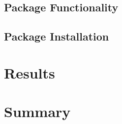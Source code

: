 \documentclass{pracamgr}
\theoremstyle{definition}
\begin{document}
	\section{Package Functionality}
		

	\section{Package Installation} \label{subsec:PackageInstall}
		
		
	
\chapter{Results}

\chapter{Summary}

%
%	
%
%		
%
%		
%		
\end{document}
